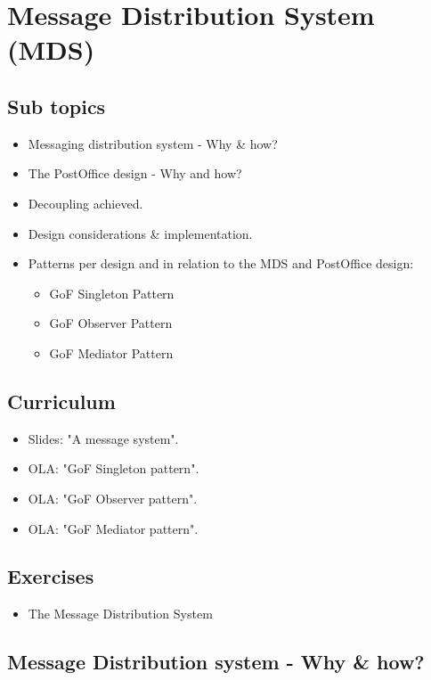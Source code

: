 \section{Message Distribution System (MDS)}

\subsection{Sub topics}

\begin{itemize}
	\item Messaging distribution system - Why \& how?
	\item The PostOffice design - Why and how?
	\item Decoupling achieved.
	\item Design considerations \& implementation.
	\item Patterns per design and in relation to the MDS and PostOffice design:
	\begin{itemize}
		\item GoF Singleton Pattern
		\item GoF Observer Pattern
		\item GoF Mediator Pattern
	\end{itemize}
\end{itemize}

\subsection{Curriculum}

\begin{itemize}
	\item Slides: "A message system".
	\item OLA: "GoF Singleton pattern".
	\item OLA: "GoF Observer pattern".
	\item OLA: "GoF Mediator pattern".
\end{itemize}

\subsection{Exercises}

\begin{itemize}
	\item The Message Distribution System
\end{itemize}

\newpage

\subsection{Message Distribution system - Why \& how?}

